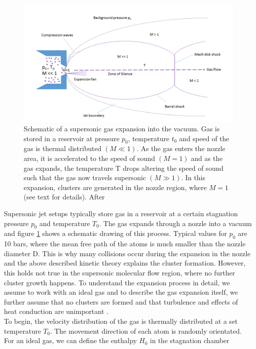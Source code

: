 \begin{figure}
	\centering
		\includegraphics[width=1.00\textwidth]{images/freeJetExpansion.png}
	\caption[Schematic of a supersonic gas expansion into a vacuum.]{Schematic of a supersonic gas expansion into the vacuum. Gas is stored in a reservoir at pressure $p_{0}$, temperature $t_{0}$ and speed of the gas is thermal distributed $\left(M\ll 1\right)$. As the gas enters the nozzle area, it is accelerated to the speed of sound $\left(M=1\right)$ and as the gas expands, the temperature T drops altering the speed of sound such that the gas now travels supersonic $\left(M\gg 1\right)$. In this expansion, clusters are generated in the nozzle region, where $M=1$ (see text for details). After \citep{Miller-1988-Oxford}}
	\label{fig:freeJetExpansion}
\end{figure}
Supersonic jet setups typically store gas in a reservoir at a certain stagnation pressure $p_{0}$ and temperature $T_{0}$. The gas expands through a nozzle into a vacuum and figure \ref{fig:freeJetExpansion} shows a schematic drawing of this process. Typical values for $p_{0}$ are 10 bars, where the mean free path of the atoms is much smaller than the nozzle diameter D. This is why many collisions occur during the expansion in the nozzle and the above described kinetic theory explains the cluster formation. However, this holds not true in the supersonic molecular flow region, where no further cluster growth happens. To understand the expansion process in detail, we assume to work with an ideal gas and to describe the gas expansion itself, we further assume that no clusters are formed and that turbulence and effects of heat conduction are unimportant \cite{Yamada-2001-SciDir,Haberland-1994-Springer}.\\
To begin, the velocity distribution of the gas is thermally distributed at a set temperature $T_{0}$. The movement direction of each atom is randomly orientated. For an ideal gas, we can define the enthalpy $H_{0}$ in the stagnation chamber
